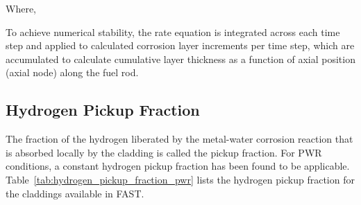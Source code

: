 Where,

To achieve numerical stability, the rate equation is integrated across each time step and applied to
calculated corrosion layer increments per time step, which are accumulated to calculate cumulative
layer thickness as a function of axial position (axial node) along the fuel rod.

\subsection{Hydrogen Pickup Fraction}\label{section:hydrogen-pickup-fraction}

The fraction of the hydrogen liberated by the metal-water corrosion reaction that is absorbed
locally by the cladding is called the pickup fraction. For PWR conditions, a constant hydrogen
pickup fraction has been found to be applicable. Table~\ref{tab:hydrogen_pickup_fraction_pwr} lists
the hydrogen pickup fraction for the claddings available in FAST.

